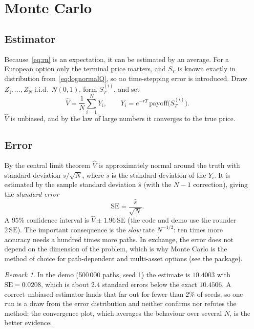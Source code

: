 \documentclass[11pt,a4paper]{article}
\newcommand{\fn}[1]{\texttt{\detokenize{#1}}}   %
\theoremstyle{plain}
\theoremstyle{remark}
\newtheorem*{remark}{Remark}
\begin{document}
\section{Monte Carlo}\label{sec:mc}

\subsection{Estimator}

Because~\eqref{eq:rn} is an expectation, it can be estimated by an average. For a European option only the terminal
price matters, and $S_T$ is known exactly in distribution from~\eqref{eq:lognormalQ}, so no time-stepping error is introduced.
Draw $Z_1,\dots,Z_N$ i.i.d.\ $N(0,1)$, form $S_T^{(i)}$, and set
\begin{equation}\label{eq:mc}
\hat V=\frac1N\sum_{i=1}^N Y_i,\qquad Y_i=e^{-rT}\,\text{payoff}\big(S_T^{(i)}\big).
\end{equation}
$\hat V$ is unbiased, and by the law of large numbers it converges to the true price.

\subsection{Error}

By the central limit theorem $\hat V$ is approximately normal around the truth with standard deviation $s/\sqrt N$, where
$s$ is the standard deviation of the $Y_i$. It is estimated by the sample standard deviation $\hat s$ (with the $N-1$ correction), giving the \emph{standard error}
\begin{equation}\label{eq:se}
\mathrm{SE}=\frac{\hat s}{\sqrt N}.
\end{equation}
A 95\% confidence interval is $\hat V\pm1.96\,\mathrm{SE}$ (the code and demo use the rounder $2\,\mathrm{SE}$). The
important consequence is the \emph{slow} rate $N^{-1/2}$: ten times more accuracy needs a hundred times more paths. In exchange, the
error does not depend on the dimension of the problem, which is why Monte Carlo is the method of choice for path-dependent and
multi-asset options (see the \fn{mc_exotics} package).

\begin{remark}
In the demo (500\,000 paths, seed 1) the estimate is $10.4003$ with $\mathrm{SE}=0.0208$, which is about $2.4$ standard errors
below the exact $10.4506$. A correct unbiased estimator lands that far out for fewer than 2\% of seeds, so one run is a draw from the error
distribution and neither confirms nor refutes the method; the convergence plot, which averages the behaviour over several $N$,
is the better evidence.
\end{remark}
\end{document}
